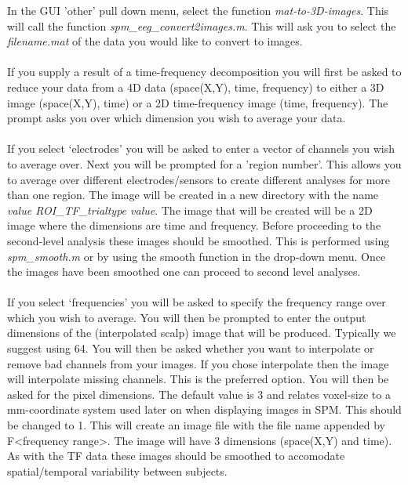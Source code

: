 In the GUI 'other' pull down menu, select the function \textit{mat-to-3D-images}. This will call the function \textit{spm\_eeg\_convert2images.m}.
This will ask you to select the \textit{filename.mat} of the data you would like to convert to images.
\\
\\
If you supply a result of a time-frequency decomposition you will first be asked to reduce your data from a 4D data (space(X,Y), time, frequency) to either a 3D image (space(X,Y), time) or a 2D time-frequency image (time, frequency). The prompt asks you over which dimension you wish to average your data.
\\
\\
If you select `electrodes' you will be asked to enter a vector of channels you wish to average over. Next you will be prompted for a 'region number'. This allows you to average over different electrodes/sensors to create different analyses for more than one region. The image will be created in a new directory with the name \textit{value ROI\_TF\_trialtype value}. The image that will be created will be a 2D image where the dimensions are time and frequency. Before proceeding to the second-level analysis these images should be smoothed. This is performed using \textit{spm\_smooth.m} or by using the smooth function in the drop-down menu. Once the images have been smoothed one can proceed to second level analyses.
\\
\\
If you select `frequencies' you will be asked to specify the frequency range over which you wish to average. You will then be prompted to enter the output dimensions of the (interpolated scalp) image that will be produced. Typically we suggest using 64.  You will then be asked whether you want to interpolate or remove bad channels from your images. If you chose interpolate then the image will interpolate missing channels. This is the preferred option. You will then be asked for the pixel dimensions. The default value is 3 and relates voxel-size to a mm-coordinate system used later on when displaying images in SPM. This should be changed to 1. This will create an image file with the file name appended by F<frequency range>. The image will have 3 dimensions (space(X,Y) and time). As with the TF data these images should be smoothed to accomodate spatial/temporal variability between subjects.
\\
\\
